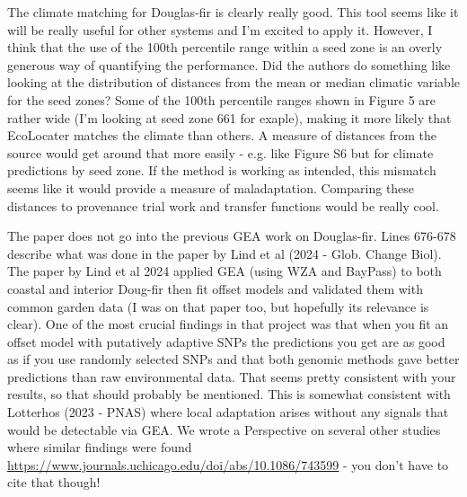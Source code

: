 \begin{point}{} %
The climate matching for Douglas-fir is clearly really good. This tool seems like it will be really useful for other systems and I'm excited to apply it. However, I think that the use of the 100th percentile range within a seed zone is an overly generous way of quantifying the performance. Did the authors do something like looking at the distribution of distances from the mean or median climatic variable for the seed zones? Some of the 100th percentile ranges shown in Figure 5 are rather wide (I'm looking at seed zone 661 for exaple), making it more likely that EcoLocater matches the climate than others. A measure of distances from the source would get around that more easily - e.g. like Figure S6 but for climate predictions by seed zone. If the method is working as intended, this mismatch seems like it would provide a measure of maladaptation. Comparing these distances to provenance trial work and transfer functions would be really cool.
\end{point}


\begin{point}{} %
The paper does not go into the previous GEA work on Douglas-fir. Lines 676-678 describe what was done in the paper by Lind et al (2024 - Glob. Change Biol). The paper by Lind et al 2024 applied GEA (using WZA and BayPass) to both coastal and interior Doug-fir then fit offset models and validated them with common garden data (I was on that paper too, but hopefully its relevance is clear). One of the most crucial findings in that project was that when you fit an offset model with putatively adaptive SNPs the predictions you get are as good as if you use randomly selected SNPs and that both genomic methods gave better predictions than raw environmental data. That seems pretty consistent with your results, so that should probably be mentioned. This is somewhat consistent with Lotterhos (2023 - PNAS) where local adaptation arises without any signals that would be detectable via GEA. We wrote a Perspective on several other studies where similar findings were found \url{https://www.journals.uchicago.edu/doi/abs/10.1086/743599} - you don't have to cite that though!
\end{point}


